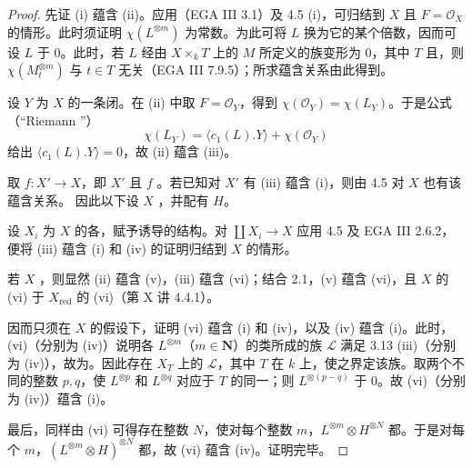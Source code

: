 \begin{proof}
先证 (i) 蕴含 (ii)。应用（EGA III 3.1）及 4.5 (i)，可归结到 $X$ 且 $F=\mathscr O_X$ 的情形。此时须证明 $\chi(L^{\otimes m})$ 为常数。为此可将 $L$ 换为它的某个倍数，因而可设 $L$ 于 $0$。此时，若 $L$ 经由 $X\times_kT$ 上的 $M$ 所定义的族变形为 $0$，其中 $T$ 且，则 $\chi(M_t^{\otimes m})$ 与 $t\in T$ 无关（EGA III 7.9.5）；所求蕴含关系由此得到。

设 $Y$ 为 $X$ 的一条闭。在 (ii) 中取 $F=\mathscr O_Y$，得到 $\chi(\mathscr O_Y)=\chi(L_Y)$。于是公式（“Riemann ”）
\[\chi(L_Y)=\langle c_1(L).Y\rangle+\chi(\mathscr O_Y)\]
给出 $\langle c_1(L).Y\rangle=0$，故 (ii) 蕴含 (iii)。

取  $f:X'\to X$，即 $X'$ 且 $f$ 。若已知对 $X'$ 有 (iii) 蕴含 (i)，则由 4.5 对 $X$ 也有该蕴含关系。
因此以下设 $X$ ，并配有 $H$。

设 $X_i$ 为 $X$ 的各，赋予诱导的结构。对 $\coprod X_i\to X$ 应用 4.5 及 EGA III 2.6.2，便将 (iii) 蕴含 (i) 和 (iv) 的证明归结到 $X$ 的情形。

若 $X$ ，则显然 (ii) 蕴含 (v)，(iii) 蕴含 (vi)；结合 2.1，(v) 蕴含 (vi)，且 $X$ 的 (vi) 于 $X_{\mathrm{red}}$ 的 (vi)（第 X 讲 4.4.1）。

因而只须在 $X$ 的假设下，证明 (vi) 蕴含 (i) 和 (iv)，以及 (iv) 蕴含 (i)。此时，(vi)（分别为 (iv)）说明各 $L^{\otimes m}$（$m\in\mathbf N$）的类所成的族 $\mathscr L$ 满足 3.13 (iii)（分别为 (iv)），故为。因此存在 $X_T$ 上的 $\mathscr L$，其中 $T$ 在 $k$ 上，使之界定该族。取两个不同的整数 $p,q$，使 $L^{\otimes p}$ 和 $L^{\otimes q}$ 对应于 $T$ 的同一；则 $L^{\otimes(p-q)}$ 于 $0$。故 (vi)（分别为 (iv)）蕴含 (i)。

最后，同样由 (vi) 可得存在整数 $N$，使对每个整数 $m$，$L^{\otimes m}\otimes H^{\otimes N}$ 都。于是对每个 $m$，$(L^{\otimes m}\otimes H)^{\otimes N}$ 都，故 (vi) 蕴含 (iv)。证明完毕。
\end{proof}
